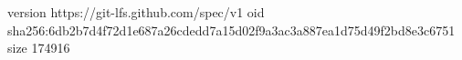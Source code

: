 version https://git-lfs.github.com/spec/v1
oid sha256:6db2b7d4f72d1e687a26cdedd7a15d02f9a3ac3a887ea1d75d49f2bd8e3c6751
size 174916
